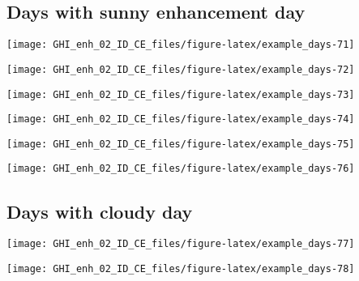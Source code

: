 \documentclass[
  10pt,
  a4paper,oneside]{article}
\begin{document}
\FloatBarrier

\hypertarget{days-with-sunny-enhancement-day}{%
\subsection{Days with sunny enhancement day}\label{days-with-sunny-enhancement-day}}

\begin{center}\texttt{[image: GHI\_enh\_02\_ID\_CE\_files/figure-latex/example\_days-71]} \end{center}

\begin{center}\texttt{[image: GHI\_enh\_02\_ID\_CE\_files/figure-latex/example\_days-72]} \end{center}

\begin{center}\texttt{[image: GHI\_enh\_02\_ID\_CE\_files/figure-latex/example\_days-73]} \end{center}

\begin{center}\texttt{[image: GHI\_enh\_02\_ID\_CE\_files/figure-latex/example\_days-74]} \end{center}

\begin{center}\texttt{[image: GHI\_enh\_02\_ID\_CE\_files/figure-latex/example\_days-75]} \end{center}

\begin{center}\texttt{[image: GHI\_enh\_02\_ID\_CE\_files/figure-latex/example\_days-76]} \end{center}

\FloatBarrier

\hypertarget{days-with-cloudy-day}{%
\subsection{Days with cloudy day}\label{days-with-cloudy-day}}

\begin{center}\texttt{[image: GHI\_enh\_02\_ID\_CE\_files/figure-latex/example\_days-77]} \end{center}

\begin{center}\texttt{[image: GHI\_enh\_02\_ID\_CE\_files/figure-latex/example\_days-78]} \end{center}
\end{document}
